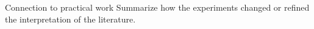 \begin{frame}{Connection to practical work}
  Summarize how the experiments changed or refined the interpretation of the literature.
\end{frame}
